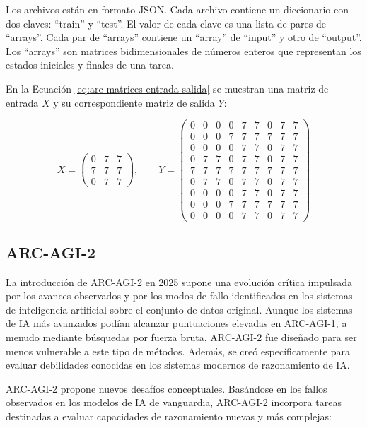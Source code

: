 \documentclass[11pt,a4paper,spanish]{book}
\numberwithin{equation}{chapter}
\numberwithin{figure}{chapter}
\begin{document}
Los archivos están en formato JSON. Cada archivo contiene un diccionario con dos claves: ``train'' y ``test''. El valor de cada clave es una lista de pares de ``arrays''.
Cada par de ``arrays'' contiene un ``array'' de ``input'' y otro de ``output''. Los ``arrays'' son matrices bidimensionales de números enteros que representan los estados iniciales y finales de una tarea.

En la Ecuación \eqref{eq:arc-matrices-entrada-salida} se muestran una matriz de entrada $X$ y su correspondiente matriz de salida $Y$:

\begin{equation}\label{eq:arc-matrices-entrada-salida}
X=
\begin{pmatrix}
0&7&7\\
7&7&7\\
0&7&7
\end{pmatrix},
\qquad
Y=
\begin{pmatrix}
0&0&0&0&7&7&0&7&7\\
0&0&0&7&7&7&7&7&7\\
0&0&0&0&7&7&0&7&7\\
0&7&7&0&7&7&0&7&7\\
7&7&7&7&7&7&7&7&7\\
0&7&7&0&7&7&0&7&7\\
0&0&0&0&7&7&0&7&7\\
0&0&0&7&7&7&7&7&7\\
0&0&0&0&7&7&0&7&7
\end{pmatrix}
\end{equation}

\subsection{ARC-AGI-2}

La introducción de ARC-AGI-2 en 2025 supone una evolución crítica impulsada por los avances observados y por los modos de fallo identificados en los 
sistemas de inteligencia artificial sobre el conjunto de datos original. Aunque los sistemas de IA más avanzados podían alcanzar puntuaciones elevadas
en ARC-AGI-1, a menudo mediante búsquedas por fuerza bruta, ARC-AGI-2 fue diseñado para ser menos vulnerable a este tipo de métodos. Además, se creó
específicamente para evaluar debilidades conocidas en los sistemas modernos de razonamiento de IA.

ARC-AGI-2 propone nuevos desafíos conceptuales. Basándose en los fallos observados en los modelos de IA de vanguardia, ARC-AGI-2 incorpora tareas
destinadas a evaluar capacidades de razonamiento nuevas y más complejas:
\end{document}
